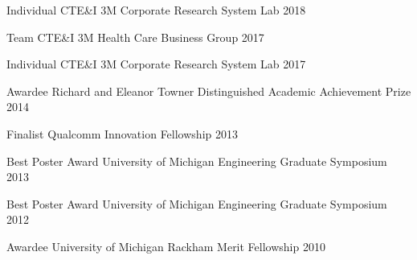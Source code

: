 

\begin{cvhonors}

  \cvhonor
    {Individual CTE\&I} %
    {3M Corporate Research System Lab} %
    {} %
    {2018} %

  \cvhonor
    {Team CTE\&I} %
    {3M Health Care Business Group} %
    {} %
    {2017} %

  \cvhonor
    {Individual CTE\&I} %
    {3M Corporate Research System Lab} %
    {} %
    {2017} %

  \cvhonor
    {Awardee} %
    {Richard and Eleanor Towner Distinguished Academic Achievement Prize} %
    {} %
    {2014} %

  \cvhonor
    {Finalist} %
    {Qualcomm Innovation Fellowship} %
    {} %
    {2013} %

  \cvhonor
    {Best Poster Award} %
    {University of Michigan Engineering Graduate Symposium} %
    {} %
    {2013} %

  \cvhonor
    {Best Poster Award} %
    {University of Michigan Engineering Graduate Symposium} %
    {} %
    {2012} %

  \cvhonor
    {Awardee} %
    {University of Michigan Rackham Merit Fellowship} %
    {} %
    {2010} %

\end{cvhonors}

